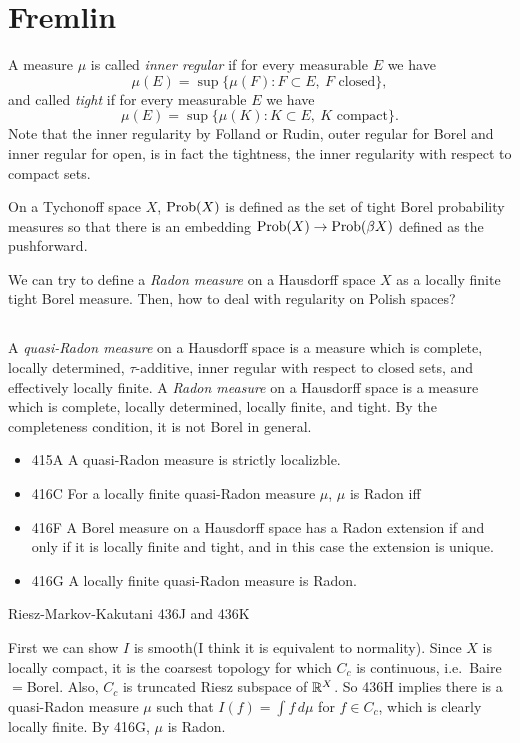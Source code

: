 \documentclass{../../large}
\begin{document}
\section*{Fremlin}


A measure $\mu$ is called \emph{inner regular} if for every measurable $E$ we have
\[\mu(E)=\sup\{\mu(F):F\subset E,\ \text{$F$ closed}\},\]
and called \emph{tight} if for every measurable $E$ we have
\[\mu(E)=\sup\{\mu(K):K\subset E,\ \text{$K$ compact}\}.\]
Note that the inner regularity by Folland or Rudin, outer regular for Borel and inner regular for open, is in fact the tightness, the inner regularity with respect to compact sets.

On a Tychonoff space $X$, $\operatorname{Prob}(X)$ is defined as the set of tight Borel probability measures so that there is an embedding $\operatorname{Prob}(X)\to\operatorname{Prob}(\beta X)$ defined as the pushforward.

We can try to define a \emph{Radon measure} on a Hausdorff space $X$ as a locally finite tight Borel measure.
Then, how to deal with regularity on Polish spaces?

\subsection{}



A \emph{quasi-Radon measure} on a Hausdorff space is a measure which is complete, locally determined, $\tau$-additive, inner regular with respect to closed sets, and effectively locally finite.
A \emph{Radon measure} on a Hausdorff space is a measure which is complete, locally determined, locally finite, and tight.
By the completeness condition, it is not Borel in general.
\begin{itemize}
\item 415A A quasi-Radon measure is strictly localizble.
\item 416C For a locally finite quasi-Radon measure $\mu$, $\mu$ is Radon iff 
\item 416F A Borel measure on a Hausdorff space has a Radon extension if and only if it is locally finite and tight, and in this case the extension is unique.
\item 416G A locally finite quasi-Radon measure is Radon.
\end{itemize}




Riesz-Markov-Kakutani 436J and 436K
\begin{pf}
First we can show $I$ is smooth(I think it is equivalent to normality).
Since $X$ is locally compact, it is the coarsest topology for which $C_c$ is continuous, i.e.~Baire$=$Borel.
Also, $C_c$ is truncated Riesz subspace of $\mathbb{R}^X$.
So 436H implies there is a quasi-Radon measure $\mu$ such that $I(f)=\int f\,d\mu$ for $f\in C_c$, which is clearly locally finite.
By 416G, $\mu$ is Radon.
\end{pf}
\end{document}
